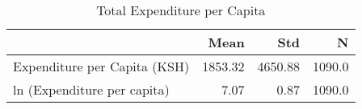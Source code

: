\begin{table}[h]
\centering
\caption{Total Expenditure per Capita}
\begin{tabular}{lrrr}
\toprule
{} &         Mean &          Std &       N \\
\midrule
Expenditure per Capita (KSH) &  1853.32 &  4650.88 &  1090.0 \\
ln (Expenditure per capita)  &     7.07 &     0.87 &  1090.0 \\
\bottomrule
\end{tabular}
\label{table:3}
\end{table}